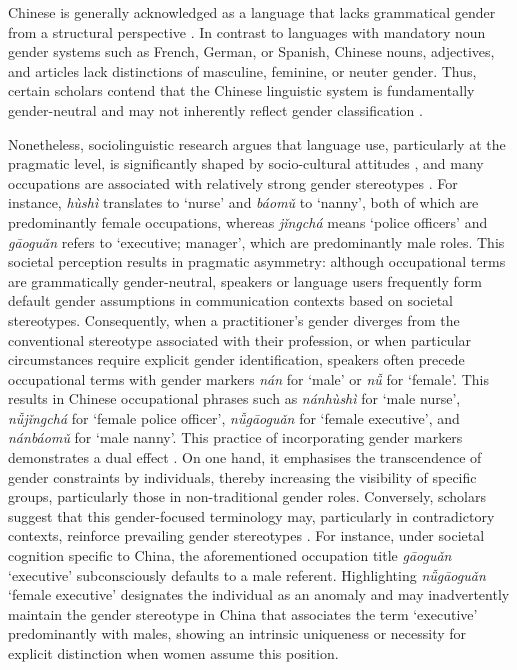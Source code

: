 \documentclass[11pt]{article}
\newcommand{\zh}[1]{\simplifiedchinesefont{#1}\rmfamily}
\begin{document}
Chinese is generally acknowledged as a language that lacks grammatical gender from a structural perspective \citep{li_1989_mandarin}. In contrast to languages with mandatory noun gender systems such as French, German, or Spanish, Chinese nouns, adjectives, and articles lack distinctions of masculine, feminine, or neuter gender. Thus, certain scholars contend that the Chinese linguistic system is fundamentally gender-neutral and may not inherently reflect gender classification \citep{li_1989_mandarin,packard_2000_morphology}.

Nonetheless, sociolinguistic research argues that language use, particularly at the pragmatic level, is significantly shaped by socio-cultural attitudes \citep{labov_1972_sociolinguistic}, and many occupations are associated with relatively strong gender stereotypes \citep{sun_1997_language,su_2021_occupational}. For instance, \zh{护士} \textit{hùshì} translates to `nurse' and \zh{保姆} \textit{báomǔ} to `nanny', both of which are predominantly female occupations, whereas \zh{警察} \textit{jǐngchá} means `police officers' and \zh{高管} \textit{gāoguǎn} refers to `executive; manager', which are predominantly male roles. This societal perception results in pragmatic asymmetry: although occupational terms are grammatically gender-neutral, speakers or language users frequently form default gender assumptions in communication contexts based on societal stereotypes. Consequently, when a practitioner's gender diverges from the conventional stereotype associated with their profession, or when particular circumstances require explicit gender identification, speakers often precede occupational terms with gender markers \zh{男} \textit{nán} for `male' or \zh{女} \textit{nǚ} for `female'. This results in Chinese occupational phrases such as \zh{男护士} \textit{nánhùshì} for `male nurse', \zh{女警察} \textit{nǚjǐngchá} for `female police officer', \zh{女高管} \textit{nǚgāoguǎn} for `female executive', and \zh{男保姆} \textit{nánbáomǔ} for `male nanny'. This practice of incorporating gender markers demonstrates a dual effect \citep{sun_1997_language,gustafssonsenden_2015_introducing,su_2021_occupational}. On one hand, it emphasises the transcendence of gender constraints by individuals, thereby increasing the visibility of specific groups, particularly those in non-traditional gender roles. Conversely, scholars suggest that this gender-focused terminology may, particularly in contradictory contexts, reinforce prevailing gender stereotypes \citep{sun_1997_language,gustafssonsenden_2015_introducing}. For instance, under societal cognition specific to China, the aforementioned occupation title \zh{高管} \textit{gāoguǎn} `executive' subconsciously defaults to a male referent. Highlighting \zh{女高管} \textit{nǚgāoguǎn} `female executive' designates the individual as an anomaly and may inadvertently maintain the gender stereotype in China that associates the term `executive' predominantly with males, showing an intrinsic uniqueness or necessity for explicit distinction when women assume this position.
\end{document}
